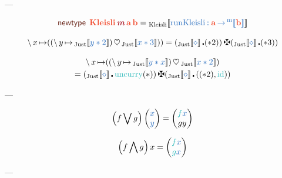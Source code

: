 \documentclass[a5paper,twoside,fleqn,draft]{jsbook}
\def\[{[\![}
\def\]{]\!]}
\def\keywordColor{Sepia}
\def\varColor{NavyBlue}
\def\funcColor{BlueGreen}
\def\typeColor{RedOrange}
\def\typeConstColor{Maroon}
\newcommand{\mKeyword}[1]{\textcolor{\keywordColor}{\mathsf{#1}}}
\newcommand{\mNewTypeDeclKeyword}{\mKeyword{newtype}}
\newcommand{\mTypeConstructor}[1]{\textcolor{\typeConstColor}{\textbf{\textit{#1}}}}
\DeclareMathOperator{\mNewTypeDecl}{\mNewTypeDeclKeyword}
\newcommand{\mVar}[1]{\textcolor{\varColor}{#1}}
\newcommand{\mAnonParam}{\diamond}
\newcommand{\mXVar}{\mVar{x}}
\newcommand{\mYVar}{\mVar{y}}
\newcommand{\mFunc}[1]{\textcolor{\funcColor}{#1}}
\newcommand{\mSpecialFunc}[1]{\textcolor{\funcColor}{\textrm{#1}}}
\newcommand{\mFFunc}{{\mFunc{f}}}
\newcommand{\mGFunc}{\mFunc{g}}
\DeclareMathOperator{\mId}{\mSpecialFunc{id}}
\DeclareMathOperator{\mUncurry}{\mSpecialFunc{uncurry}}
\DeclareMathOperator{\mBind}{\heartsuit}
\DeclareMathOperator{\mBindComp}{\maltese}
\DeclareMathOperator{\mCompFunc}{\centerdot}
\DeclareMathOperator{\mFuncArrow}{\rightarrow}
\DeclareMathOperator{\mIn}{{:\!:}}
\DeclareMathOperator{\mLambda}{\backslash}
\DeclareMathOperator{\mLambdaArrow}{\mapsto}
\newcommand{\mType}[1]{\textcolor{\typeColor}{\mathbf{#1}}}
\newcommand{\mA}{\mType{a}}
\newcommand{\mB}{\mType{b}}
\newcommand{\mTypeAssemble}[2]{{}^\mathrm{#1}\[\mType{#2}\]}
\newcommand{\mValueConstructor}[1]{\mathrm{#1}}
\newcommand{\mValueWith}[2]{{}_\mValueConstructor{#1}\[\mVar{#2}\]}
\newcommand{\mJustWith}[1]{\mValueWith{Just}{#1}}
\newcommand{\mPairWith}[2]{\begin{pmatrix}#1\\#2\end{pmatrix}}
\begin{document}
---

\newcommand{\mKleisliType}{\mType{Kleisli}}
\newcommand{\mKleisliWith}[1]{\mValueWith{Kleisli}{#1}}
\newcommand{\mRunKleisli}{\mathop{\mathrm{runKleisli}}}

\begin{equation}
  \mNewTypeDecl\;
  \mKleisliType\,\mTypeConstructor{m}\,\mA\,\mB
  =\mKleisliWith{\mRunKleisli\mIn\mA\mFuncArrow\mTypeAssemble{m}{b}}
\end{equation}

\begin{equation}
  \mLambda x\mLambdaArrow((\mLambda y\mLambdaArrow\mJustWith{y*2})\mBind{}\mJustWith{x*3}))
  =(\mJustWith{\mAnonParam}\mCompFunc(*2))\mBindComp(\mJustWith{\mAnonParam}\mCompFunc(*3))
\end{equation}

\begin{multline}
  \mLambda x\mLambdaArrow((\mLambda y\mLambdaArrow\mJustWith{y*x})\mBind{}\mJustWith{x*2})\\
  =(\mJustWith{\mAnonParam}\mCompFunc\mUncurry(*))\mBindComp(\mJustWith{\mAnonParam}\mCompFunc{}((*2),\mId))
\end{multline}

---

\begin{equation}
  \left(f\bigvee g\right)\mPairWith{\mXVar}{\mYVar}=\mPairWith{\mFFunc\mXVar}{gy}
\end{equation}

\begin{equation}
  \left(f\bigwedge g\right)x=\mPairWith{\mFFunc\mXVar}{\mGFunc\mXVar}
\end{equation}

---



\end{document}
